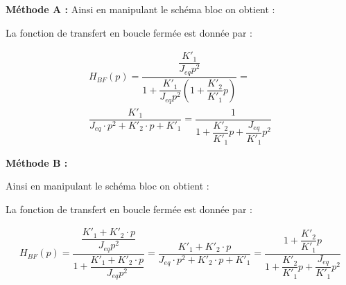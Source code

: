 \documentclass[10pt,fleqn]{article} %
\begin{document}
\begin{minipage}[t]{0.4\textwidth}
\textbf{Méthode A :}
Ainsi en manipulant le schéma bloc on obtient : 

\begin{center}
\end{center}

La fonction de transfert en boucle fermée est donnée par : 

\begin{align*}
H_{BF}(p)=\dfrac{\dfrac{K'_1}{J_{eq}p^2}}{1+\dfrac{K'_1}{J_{eq}p^2}\left(1+\dfrac{K'_2}{K'_1}p\right)}=
\\
\dfrac{K'_1}{J_{eq}\cdot p^2+K'_2\cdot p+K'_1}=\dfrac{1}{1+\dfrac{K'_2}{K'_1}p+\dfrac{J_{eq}}{K'_1}p^2}
\end{align*}


\end{minipage}
\vline
\begin{minipage}[t]{0.4\textwidth}
\textbf{Méthode B :}

Ainsi en manipulant le schéma bloc on obtient : 

\begin{center}
\begin{large}
\end{large}
\end{center}

La fonction de transfert en boucle fermée est donnée par : 

\begin{align*}
H_{BF}(p)=\dfrac{\dfrac{K'_1+K'_2\cdot p}{J_{eq}p^2}}{1+\dfrac{K'_1+K'_2\cdot p}{J_{eq}p^2}}=
\dfrac{K'_1+K'_2\cdot p}{J_{eq}\cdot p^2+K'_2\cdot p+K'_1}=\dfrac{1+\dfrac{K'_2}{K'_1}p}{1+\dfrac{K'_2}{K'_1}p+\dfrac{J_{eq}}{K'_1}p^2}
\end{align*}


\end{minipage}
\end{document}
